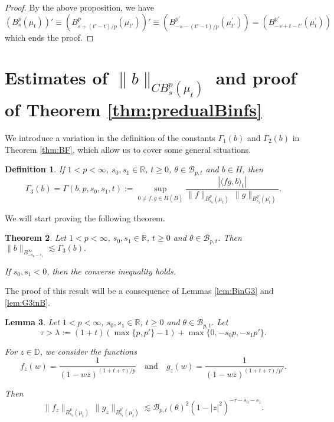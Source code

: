 \documentclass[12pt,twoside,leqno,final]{amsart}
\theoremstyle{plain}
\newtheorem{thm}{Theorem}[section]
\newtheorem{lem}[thm]{Lemma}
\newtheorem{defn}[thm]{Definition}
\begin{document}
\begin{proof}
By the above proposition, we have 
$$
\left(B^p_{s}(\mu_t) \right)'\equiv \left(B^p_{s+(t'-t)/p}(\mu_{t'})\right)' 
\equiv \left( B^{p'}_{-s-(t'-t)/p}(\mu^\prime_{t'})\right)
=\left( B^{p'}_{-s+t-t'}(\mu^\prime_{t})\right)
$$
which ends the proof.
\end{proof}

\section{Estimates of $\|b\|_{CB^p_s(\mu_t)}$ and proof 
of Theorem \ref{thm:predualBinfs}}\label{sec:snegative}

We introduce a variation in the definition of 
the constants $\Gamma_1(b) $ and $\Gamma_2(b) $ in Theorem \ref{thm:BF}, 
which allow us to cover some general situations.

\begin{defn}
If $1<p<\infty$, $s_0,s_1\in{{\mathbb R}}$, $t\ge 0$, $\theta\in {{\mathcal B}}_{p,t}$ and $b\in H$, then 
$$
\Gamma_3(b)=\Gamma(b,p,s_0,s_1,t):=\sup_{0\ne f,g\in H(\overline B)}
\frac{|\langle fg,b\rangle_t|}{\|f\|_{B^p_{s_0}(\mu_t)}\,\|g\|_{B^{p'}_{s_1}(\mu^\prime_t)}}.
$$
\end{defn}

We will start proving the following theorem.

\begin{thm}\label{thm:normG3}
Let $1<p<\infty$, $s_0,s_1\in{{\mathbb R}}$, $t\ge 0$ and $\theta\in {{\mathcal B}}_{p,t}$. 
Then $\|b\|_{B^\infty_{-s_0-s_1}}\lesssim \Gamma_3(b).$

If $s_0,s_1<0$, then the converse inequality holds.
\end{thm}

The proof of this result will be a consequence of Lemmas \ref{lem:BinG3} and \ref{lem:G3inB}.

\begin{lem} \label{lem:fznorms}
Let $1<p<\infty$, $s_0,s_1\in{{\mathbb R}}$, $t\ge 0$ and $\theta\in {{\mathcal B}}_{p,t}$. Let 
\begin{equation}\label{eqn:fznorms}
\tau>\lambda:=(1+t)(\max\{p,p'\}-1)+\max\{0,-s_0p,-s_1 p'\}.
\end{equation}

For  $z\in{{\mathbb D}}$, we consider the functions  
$$
f_z(w)= \frac{1}{(1-w\overline z)^{(1+t+\tau)/p}}
\quad\text{and}\quad
g_z(w)= \frac{1}{(1-w\overline z)^{(1+t+\tau)/p'}}.
$$

Then 
$$
\|f_z\|_{B^p_{s_0}(\mu_t)}\,\|g_z\|_{B^{p'}_{s_1}(\mu^\prime_t)}
\lesssim {{\mathcal B}}_{p,t}(\theta)^2(1-|z|^2)^{-\tau-s_0-s_1}.
$$
\end{lem}
\end{document}
